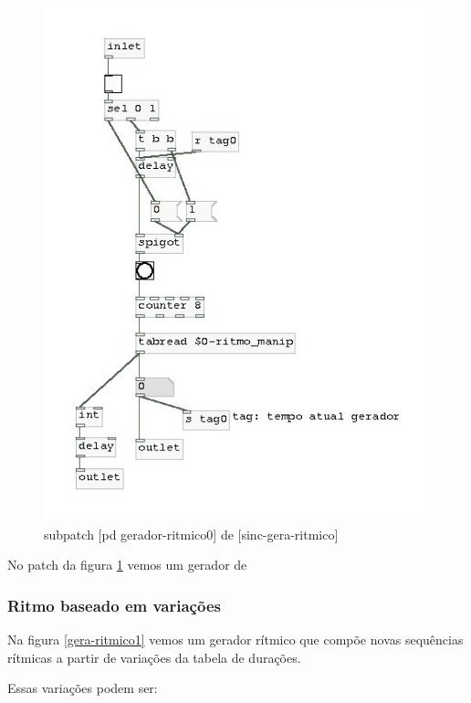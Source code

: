 \documentclass[draft]{ppgmus}
\begin{document}
\begin{figure}
\includegraphics[scale=.6]{gerador-ritmico0}
\caption{subpatch [pd gerador-ritmico0] de [sinc-gera-ritmico]}
\label{gera-ritmico0}
\end{figure}   


No patch da figura \ref{gera-ritmico0} vemos um gerador de



 \subsubsection{Ritmo baseado em variações}


Na figura \ref{gera-ritmico1} vemos um gerador rítmico
que compõe novas sequências rítmicas a partir de variações
da tabela de durações.

Essas variações podem ser:
\end{document}
